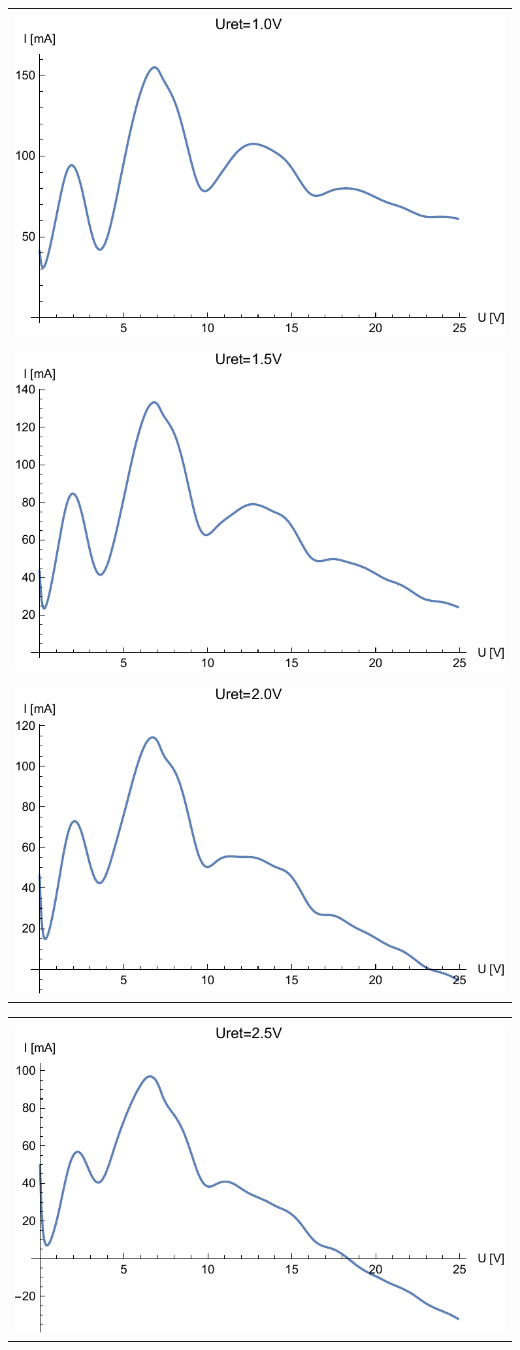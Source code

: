 \documentclass[paper=a4, fontsize=12pt]{scrartcl}
\begin{document}
{\begin{tabular}{|c|}
	\hline\\
	\includegraphics[width=0.7\linewidth]{wyk9}
	\label{fig:wyk9}\\
	\hline\\
	\includegraphics[width=0.7\linewidth]{wyk10}
	\label{fig:wyk10}\\
	\hline\\
	\includegraphics[width=0.7\linewidth]{wyk6}
	\label{fig:wyk6}\\
	\hline
\end{tabular}

\begin{tabular}{|c|}
	\hline\\
		\includegraphics[width=0.65\linewidth]{wyk7}
	\label{fig:wyk7}\\
	\hline
\end{tabular}
}
\end{document}

